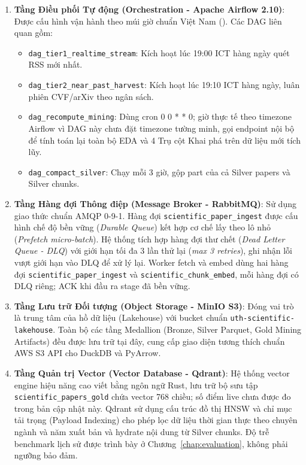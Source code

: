 \begin{enumerate}[label=\textbf{\arabic*.}]
  \item \textbf{Tầng Điều phối Tự động (Orchestration - Apache Airflow 2.10)}:
    Được cấu hình vận hành theo múi giờ chuẩn Việt Nam (). Các DAG liên quan gồm:
    \begin{itemize}
      \item \texttt{dag\_tier1\_realtime\_stream}: Kích hoạt lúc 19:00 ICT hàng ngày quét RSS mới nhất.
      \item \texttt{dag\_tier2\_near\_past\_harvest}: Kích hoạt lúc 19:10 ICT hàng ngày, luân phiên CVF/arXiv theo ngân sách.
      \item \texttt{dag\_recompute\_mining}: Dùng cron 0 0 * * 0; giờ thực tế theo timezone Airflow vì DAG này chưa đặt timezone tường minh, gọi endpoint nội bộ  để tính toán lại toàn bộ EDA và 4 Trụ cột Khai phá trên dữ liệu mới tích lũy.
      \item \texttt{dag\_compact\_silver}: Chạy mỗi 3 giờ, gộp part của cả Silver papers và Silver chunks.
    \end{itemize}
  \item \textbf{Tầng Hàng đợi Thông điệp (Message Broker - RabbitMQ)}:
    Sử dụng giao thức chuẩn AMQP 0-9-1. Hàng đợi \texttt{scientific\_paper\_ingest} được cấu hình chế độ bền vững (\textit{Durable Queue}) kết hợp cơ chế lấy theo lô nhỏ (\textit{Prefetch micro-batch}). Hệ thống tích hợp hàng đợi thư chết (\textit{Dead Letter Queue - DLQ}) với giới hạn tối đa 3 lần thử lại (\textit{max 3 retries}), ghi nhận lỗi vượt giới hạn vào DLQ để xử lý lại. Worker fetch và embed dùng hai hàng đợi \texttt{scientific\_paper\_ingest} và \texttt{scientific\_chunk\_embed}, mỗi hàng đợi có DLQ riêng; ACK khi đầu ra stage đã bền vững.
  \item \textbf{Tầng Lưu trữ Đối tượng (Object Storage - MinIO S3)}:
    Đóng vai trò là trung tâm của hồ dữ liệu (Lakehouse) với bucket chuẩn \texttt{uth-scientific-lakehouse}. Toàn bộ các tầng Medallion (Bronze, Silver Parquet, Gold Mining Artifacts) đều được lưu trữ tại đây, cung cấp giao diện tương thích chuẩn AWS S3 API cho DuckDB và PyArrow.
  \item \textbf{Tầng Quản trị Vector (Vector Database - Qdrant)}:
    Hệ thống vector engine hiệu năng cao viết bằng ngôn ngữ Rust, lưu trữ bộ sưu tập \texttt{scientific\_papers\_gold} chứa vector 768 chiều; số điểm live chưa được đo trong bản cập nhật này. Qdrant sử dụng cấu trúc đồ thị HNSW và chỉ mục tải trọng (Payload Indexing) cho phép lọc dữ liệu thời gian thực theo chuyên ngành và năm xuất bản và hydrate nội dung từ Silver chunks. Độ trễ benchmark lịch sử được trình bày ở Chương~\ref{chap:evaluation}, không phải ngưỡng bảo đảm.

\end{enumerate}
